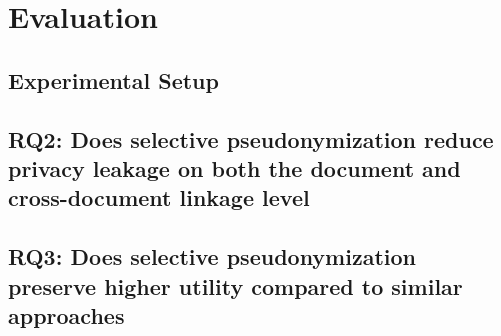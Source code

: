 \chapter{Evaluation}\label{chapter:evaluation}
\section{Experimental Setup}
\section{RQ2: Does selective pseudonymization reduce privacy leakage on both the document and cross-document linkage level}
\section{RQ3: Does selective pseudonymization preserve higher utility compared to similar approaches}